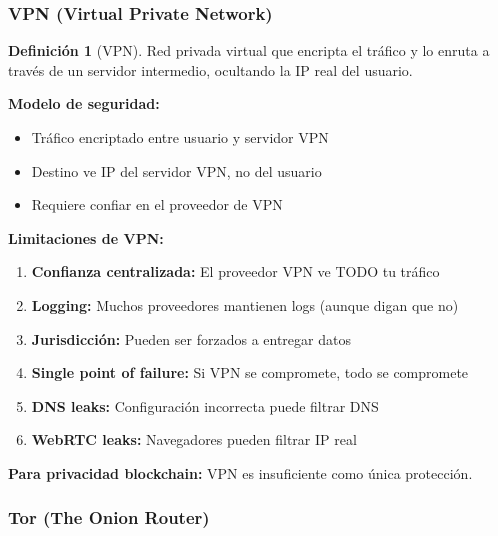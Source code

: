 \documentclass[11pt,a4paper,twoside]{book}
\theoremstyle{definition}
\newtheorem{definition}{Definición}[chapter]
\theoremstyle{remark}
\begin{document}
\subsubsection{VPN (Virtual Private Network)}

\begin{definition}[VPN]
Red privada virtual que encripta el tráfico y lo enruta a través de un servidor intermedio, ocultando la IP real del usuario.

\textbf{Modelo de seguridad:}
\begin{itemize}
    \item Tráfico encriptado entre usuario y servidor VPN
    \item Destino ve IP del servidor VPN, no del usuario
    \item Requiere confiar en el proveedor de VPN
\end{itemize}
\end{definition}

\begin{advertencia}
\textbf{Limitaciones de VPN:}
\begin{enumerate}
    \item \textbf{Confianza centralizada:} El proveedor VPN ve TODO tu tráfico
    \item \textbf{Logging:} Muchos proveedores mantienen logs (aunque digan que no)
    \item \textbf{Jurisdicción:} Pueden ser forzados a entregar datos
    \item \textbf{Single point of failure:} Si VPN se compromete, todo se compromete
    \item \textbf{DNS leaks:} Configuración incorrecta puede filtrar DNS
    \item \textbf{WebRTC leaks:} Navegadores pueden filtrar IP real
\end{enumerate}

\textbf{Para privacidad blockchain:} VPN es insuficiente como única protección.
\end{advertencia}

\subsubsection{Tor (The Onion Router)}
\end{document}
